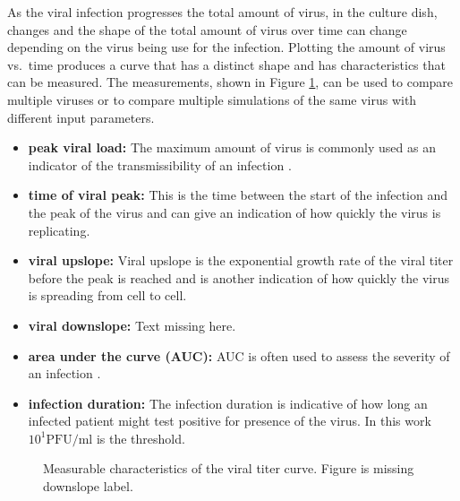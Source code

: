 As the viral infection progresses the total amount of virus, in the culture dish, changes and the shape of the total amount of virus over time can change depending on the virus being use for the infection. Plotting the amount of virus vs.\ time produces a curve that has a distinct shape and has characteristics that can be measured. The measurements, shown in Figure \ref{measurements}, can be used to compare multiple viruses or to compare multiple simulations of the same virus with different input parameters.

\begin{itemize}
\item \textbf{peak viral load:} The maximum amount of virus is commonly used as an indicator of the transmissibility of an infection \citep{handel09}. 
\item \textbf{time of viral peak:} This is the time between the start of the infection and the peak of the virus and can give an indication of how quickly the virus is replicating.
\item \textbf{viral upslope:} Viral upslope is the exponential growth rate of the viral titer before the peak is reached and is another indication of how quickly the virus is spreading from cell to cell. 
\item \textbf{viral downslope:} \color{red}Text missing here.\color{black}
\item \textbf{area under the curve (AUC):} AUC is often used to assess the severity of an infection \citep{hayden00, barroso05}.
\item \textbf{infection duration:} The infection duration is indicative of how long an infected patient might test positive for presence of the virus. In this work $10^1 \mathrm{PFU/ml}$ is the threshold.
\end{itemize}
\begin{figure}
\begin{center}
    \caption{Measurable characteristics of the viral titer curve.\color{red} Figure is missing downslope label.\color{black}}
    \label{measurements}
\end{center}
\end{figure}


